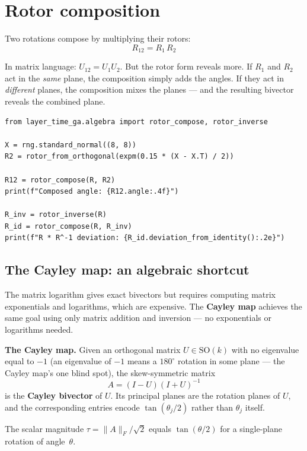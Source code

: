 \documentclass[11pt, twoside, openright]{memoir}
\newcommand{\gp}{\,}              %
\numberwithin{equation}{chapter}
\begin{document}
\section{Rotor composition}

Two rotations compose by multiplying their rotors:
\begin{equation}
  R_{12} = R_1 \gp R_2
\end{equation}

In matrix language: $U_{12} = U_1 U_2$.  But the rotor form reveals
more.  If $R_1$ and $R_2$ act in the \emph{same} plane, the composition
simply adds the angles.  If they act in \emph{different} planes, the
composition mixes the planes --- and the resulting bivector reveals the
combined plane.

\begin{lstlisting}[caption={Composing and inverting rotors}]
from layer_time_ga.algebra import rotor_compose, rotor_inverse

X = rng.standard_normal((8, 8))
R2 = rotor_from_orthogonal(expm(0.15 * (X - X.T) / 2))

R12 = rotor_compose(R, R2)
print(f"Composed angle: {R12.angle:.4f}")

R_inv = rotor_inverse(R)
R_id = rotor_compose(R, R_inv)
print(f"R * R^-1 deviation: {R_id.deviation_from_identity():.2e}")
\end{lstlisting}

\subsection*{The Cayley map: an algebraic shortcut}

The matrix logarithm gives exact bivectors but requires computing matrix
exponentials and logarithms, which are expensive.  The \textbf{Cayley map}
achieves the same goal using only matrix addition and inversion --- no
exponentials or logarithms needed.

\begin{gabox}
\textbf{The Cayley map.}
Given an orthogonal matrix $U \in \mathrm{SO}(k)$ with no eigenvalue
equal to $-1$ (an eigenvalue of $-1$ means a $180^\circ$ rotation in
some plane --- the Cayley map's one blind spot), the skew-symmetric matrix
\begin{equation}
  A = (I - U)(I + U)^{-1}
\end{equation}
is the \textbf{Cayley bivector} of $U$.  Its principal planes are the
rotation planes of $U$, and the corresponding entries encode
$\tan(\theta_j / 2)$ rather than $\theta_j$ itself.

The scalar magnitude $\tau = \|A\|_F / \sqrt{2}$ equals $\tan(\theta/2)$
for a single-plane rotation of angle~$\theta$.
\end{gabox}
\end{document}
